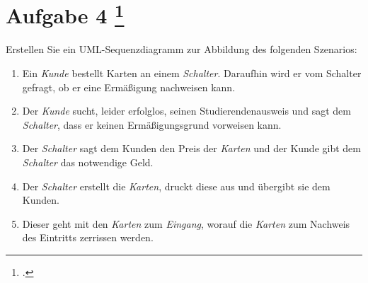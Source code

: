 \documentclass{lehramt-informatik-aufgabe}
\begin{document}
\section{Aufgabe 4
\footcite{66116:2020:03}}

Erstellen Sie ein UML-Sequenzdiagramm zur Abbildung des folgenden
Szenarios:

\begin{enumerate}
\item Ein \emph{Kunde} bestellt Karten an einem \emph{Schalter}.
Daraufhin wird er vom Schalter gefragt, ob er eine Ermäßigung nachweisen
kann.

\item Der \emph{Kunde} sucht, leider erfolglos, seinen
Studierendenausweis und sagt dem \emph{Schalter}, dass er keinen
Ermäßigungsgrund vorweisen kann.

\item Der \emph{Schalter} sagt dem Kunden den Preis der \emph{Karten}
und der Kunde gibt dem \emph{Schalter} das notwendige Geld.

\item Der \emph{Schalter} erstellt die \emph{Karten}, druckt diese aus
und übergibt sie dem Kunden.

\item Dieser geht mit den \emph{Karten} zum \emph{Eingang}, worauf die
\emph{Karten} zum Nachweis des Eintritts zerrissen werden.
\end{enumerate}
\end{document}
